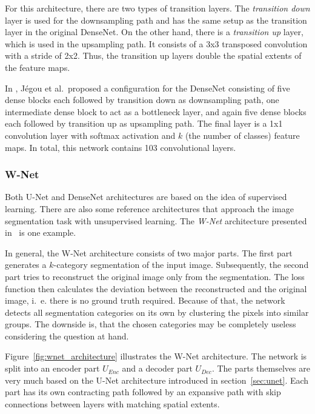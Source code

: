 For this architecture, there are two types of transition layers. The \emph{transition down} layer is used for the downsampling path and has the same setup as the transition layer in the original DenseNet. On the other hand, there is a \emph{transition up} layer, which is used in the upsampling path. It consists of a 3x3 transposed convolution with a stride of 2x2. Thus, the transition up layers double the spatial extents of the feature maps.

In \cite{denseseg17}, Jégou et al.\ proposed a configuration for the DenseNet consisting of five dense blocks each followed by transition down as downsampling path, one intermediate dense block to act as a bottleneck layer, and again five dense blocks each followed by transition up as upsampling path. The final layer is a 1x1 convolution layer with softmax activation and $k$ (the number of classes) feature maps. In total, this network contains 103 convolutional layers.

\subsubsection{W-Net}
\label{sec:w-net}
Both U-Net and DenseNet architectures are based on the idea of supervised learning. There are also some reference architectures that approach the image segmentation task with unsupervised learning. The \emph{W-Net} architecture presented in~\cite{wnet17} is one example.

In general, the W-Net architecture consists of two major parts. The first part generates a $k$-category segmentation of the input image. Subsequently, the second part tries to reconstruct the original image only from the segmentation. The loss function then calculates the deviation between the reconstructed and the original image, i.~e. there is no ground truth required. Because of that, the network detects all segmentation categories on its own by clustering the pixels into similar groups. The downside is, that the chosen categories may be completely useless considering the question at hand.

Figure~\ref{fig:wnet_architecture} illustrates the W-Net architecture. The network is split into an encoder part $U_{Enc}$ and a decoder part $U_{Dec}$. The parts themselves are very much based on the U-Net architecture introduced in section~\ref{sec:unet}. Each part has its own contracting path followed by an expansive path with skip connections between layers with matching spatial extents.

